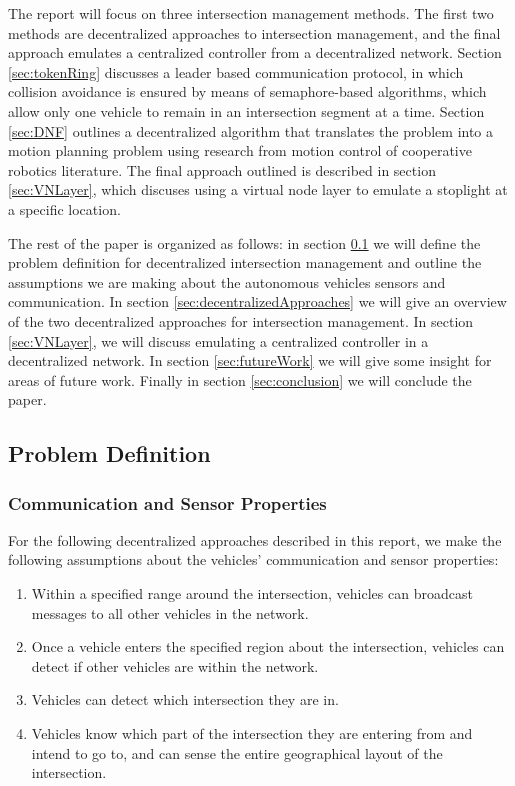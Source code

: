 \documentclass[12pt]{article}
\begin{document}
The report will focus on three intersection management methods.  The first two methods are decentralized approaches to intersection management, and the final approach emulates a centralized controller from a decentralized network.  Section \ref{sec:tokenRing}  discusses a leader based communication protocol, in which  collision avoidance is ensured by means of semaphore-based algorithms, which allow only one vehicle to remain in an intersection segment at a time.  Section \ref{sec:DNF} outlines a decentralized algorithm that translates the problem into a motion planning problem using research from motion control of cooperative robotics literature.  The final approach outlined is described in section \ref{sec:VNLayer}, which discuses using a virtual node layer to emulate a stoplight at a specific location. 
 
The rest of the  paper is organized as follows: in section \ref{sec:problemDefinition} we will define the problem definition for decentralized intersection management and outline the assumptions we are making about the autonomous vehicles sensors and communication.  In section \ref{sec:decentralizedApproaches} we will give an overview of the two decentralized approaches for intersection management.  In section \ref{sec:VNLayer}, we will discuss emulating a centralized controller in a decentralized network.  In section \ref{sec:futureWork} we will give some insight for areas of future work.  Finally in section \ref{sec:conclusion} we will conclude the paper.

\subsection{Problem Definition}
\label{sec:problemDefinition}
\subsubsection{Communication and Sensor Properties}
For the following decentralized approaches described in this report, we make the following assumptions about the vehicles' communication and sensor properties:
\begin{enumerate}
\item Within a specified range around the intersection, vehicles can broadcast messages to all other vehicles in the network. %
\item
Once a vehicle enters the specified region about the intersection, vehicles can detect if other vehicles are within the network. 
\item
Vehicles can detect which intersection they are in.
\item
Vehicles know which part of the intersection they are entering from and intend to go to, and can sense the entire geographical layout of the intersection.
\end{enumerate}
\end{document}
